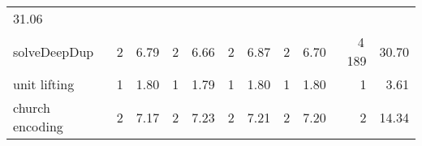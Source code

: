 \begin{tabular}{lrrrrrrrrrr}
 {\def\@currentlabel{31.06}\label{stats:RateDup:SharedFull:time}31.06} \\
\textsf{solveDeepDup}%
&
 {\def\@currentlabel{2}\label{stats:SolveDeepDup:Unshared:mem}2} &
 {\def\@currentlabel{6.79}\label{stats:SolveDeepDup:Unshared:time}6.79}&
 {\def\@currentlabel{2}\label{stats:SolveDeepDup:Shared:mem}2} &
 {\def\@currentlabel{6.66}\label{stats:SolveDeepDup:Shared:time}6.66}&
 {\def\@currentlabel{2}\label{stats:SolveDeepDup:SharedThunk:mem}2} &
 {\def\@currentlabel{6.87}\label{stats:SolveDeepDup:SharedThunk:time}6.87}&
 {\def\@currentlabel{2}\label{stats:SolveDeepDup:SharedEvaled:mem}2} &
 {\def\@currentlabel{6.70}\label{stats:SolveDeepDup:SharedEvaled:time}6.70}&
 {\def\@currentlabel{4\,189}\label{stats:SolveDeepDup:SharedFull:mem}4\,189} &
 {\def\@currentlabel{30.70}\label{stats:SolveDeepDup:SharedFull:time}30.70} \\
unit lifting%
&
 {\def\@currentlabel{1}\label{stats:Unit:Unshared:mem}1} &
 {\def\@currentlabel{1.80}\label{stats:Unit:Unshared:time}1.80}&
 {\def\@currentlabel{1}\label{stats:Unit:Shared:mem}1} &
 {\def\@currentlabel{1.79}\label{stats:Unit:Shared:time}1.79}&
 {\def\@currentlabel{1}\label{stats:Unit:SharedThunk:mem}1} &
 {\def\@currentlabel{1.80}\label{stats:Unit:SharedThunk:time}1.80}&
 {\def\@currentlabel{1}\label{stats:Unit:SharedEvaled:mem}1} &
 {\def\@currentlabel{1.80}\label{stats:Unit:SharedEvaled:time}1.80}&
 {\def\@currentlabel{1}\label{stats:Unit:SharedFull:mem}1} &
 {\def\@currentlabel{3.61}\label{stats:Unit:SharedFull:time}3.61} \\
church encoding%
&
 {\def\@currentlabel{2}\label{stats:Church:Unshared:mem}2} &
 {\def\@currentlabel{7.17}\label{stats:Church:Unshared:time}7.17}&
 {\def\@currentlabel{2}\label{stats:Church:Shared:mem}2} &
 {\def\@currentlabel{7.23}\label{stats:Church:Shared:time}7.23}&
 {\def\@currentlabel{2}\label{stats:Church:SharedThunk:mem}2} &
 {\def\@currentlabel{7.21}\label{stats:Church:SharedThunk:time}7.21}&
 {\def\@currentlabel{2}\label{stats:Church:SharedEvaled:mem}2} &
 {\def\@currentlabel{7.20}\label{stats:Church:SharedEvaled:time}7.20}&
 {\def\@currentlabel{2}\label{stats:Church:SharedFull:mem}2} &
 {\def\@currentlabel{14.34}\label{stats:Church:SharedFull:time}14.34} \\
\end{tabular}
\makeatother
